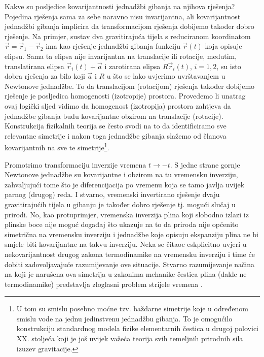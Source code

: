 Kakve su posljedice kovarijantnosti jednadžbi gibanja na njihova
rješenja?
Pojedina rješenja sama za sebe naravno nisu invarijantna, ali 
kovarijantnost jednadžbi gibanja implicira da transformacijom rješenja
dobijemo također dobro rješenje.
Na primjer, sustav dva gravitirajuća tijela s reduciranom koordinatom $\vec{r}
= \vec{r}_1 - \vec{r}_2$ ima kao
rješenje jednadžbi gibanja funkciju $\vec{r}(t)$ koja opisuje elipsu.
Sama ta elipsa nije invarijantna na translacije ili rotacije,
međutim, translatirana elipsa $\vec{r}_{i}(t)+\vec{a}$ i zarotirana
elipsa $R\vec{r}_{i}(t)$, $i=1, 2$, su isto dobra rješenja za bilo koji $\vec{a}$ i $R$
u što se lako uvjerimo uvrštavanjem u Newtonove jednadžbe.
To da translacijom (rotacijom) rješenja također dobijemo rješenje je posljedica
homogenosti (izotropije) prostora.
Provedemo li unatrag ovaj logički sljed vidimo da homogenost
(izotropija) prostora zahtjeva da jednadžbe gibanja budu kovarijantne
obzirom na translacije (rotacije). Konstrukcija fizikalnih teorija se
često svodi na to da identificiramo sve relevantne simetrije i nakon toga
jednadžbe gibanja slažemo od članova kovarijantnih na sve te simetrije\footnote{%
    U tom su smislu posebno moćne tzv. baždarne simetrije koje u
    određenom smislu vode na jednu jedinstvenu jednadžbu gibanja.
To je omogućilo konstrukciju standardnog modela fizike elementarnih čestica
u drugoj polovici XX. stoljeća koji je još uvijek važeća
teorija svih temeljnih prirodnih sila izuzev gravitacije.}.


\begin{primjer}
Promotrimo transformaciju inverzije vremena $t \to -t$.
S jedne strane gornje Newtonove jednadžbe su kovarijantne i obzirom na tu vremensku
inverziju, zahvaljujući tome što je diferencijacija po vremenu koja
se tamo javlja uvijek parnog (drugog) reda. 
I stvarno, vremenski invertirano rješenje dvaju gravitirajućih
tijela u gibanju je također dobro rješenje tj. mogući slučaj u prirodi.
No, kao protuprimjer, vremenska inverzija plina koji slobodno izlazi iz plinske boce nije
moguć događaj što ukazuje na to da priroda nije općenito simetrična na vremensku inverziju i
jednadžbe koje opisuju ekspanziju plina ne bi smjele biti kovarijantne
na takvu inverziju. Neka se čitaoc eskplicitno uvjeri u nekovarijantnost drugog
zakona termodinamike na vremensku inverziju i time će dobiti zadovoljavajuće
razumijevanje ove situacije. Stvarno razumijevanje načina na koji je narušena
ova simetrija u zakonima mehanike čestica plina (dakle ne termodinamike) 
predstavlja zloglasni problem strijele vremena \cite{Zeh:2007}.

\end{primjer}

